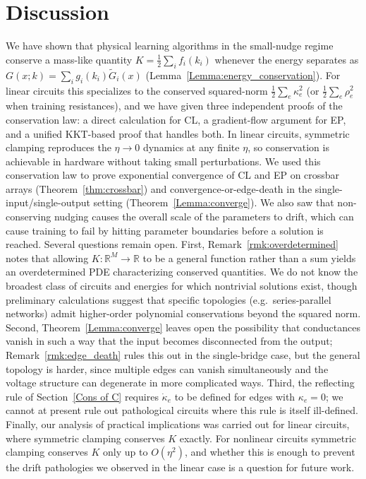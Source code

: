 \documentclass[final, 11pt, nonatbib]{elsarticle}
\theoremstyle{definition}
\theoremstyle{plain}
\numberwithin{equation}{section}
\begin{document}
 \section{Discussion}                                                       
  We have shown that physical learning algorithms in the small-nudge regime   conserve a mass-like quantity $K = \tfrac{1}{2}\sum_i f_i(k_i)$ whenever the energy separates as $G(x;k) = \sum_i g_i(k_i)\widetilde{G}_i(x)$ (Lemma~\ref{Lemma:energy_conservation}). For linear circuits this specializes to the
  conserved squared-norm $\tfrac{1}{2}\sum_e \kappa_e^2$ (or $\tfrac{1}{2}\sum_e \rho_e^2$ when training resistances), and we have given three independent proofs of the conservation law: a direct calculation for CL, a gradient-flow argument for EP, and a unified KKT-based proof that handles   both. In linear circuits, symmetric clamping reproduces the $\eta \to 0$   dynamics at any finite $\eta$, so conservation is achievable in hardware without taking small perturbations. We used this conservation law to prove exponential convergence of CL and EP on crossbar arrays (Theorem~\ref{thm:crossbar}) and convergence-or-edge-death in the single-input/single-output setting (Theorem~\ref{Lemma:converge}). We also saw that non-conserving nudging causes the overall scale of the parameters to drift, which can cause training to fail by hitting parameter boundaries before a solution is reached.                                                                                        
  Several questions remain open. First, Remark~\ref{rmk:overdetermined} notes that  allowing $K \colon \mathbb{R}^M \to \mathbb{R}$ to be a general function rather than a sum yields an overdetermined PDE characterizing conserved quantities. We do not know the broadest class of circuits and energies for which nontrivial solutions exist, though preliminary calculations suggest that specific topologies (e.g.\ series-parallel networks) admit higher-order
  polynomial conservations beyond the squared norm. Second,                  Theorem~\ref{Lemma:converge} leaves open the possibility that conductances vanish in such a way that the input becomes disconnected from the output;  Remark~\ref{rmk:edge_death} rules this out in the single-bridge case, but the general topology is harder, since multiple edges can vanish simultaneously and the voltage structure can degenerate in more complicated ways. Third, the   reflecting rule of Section~\ref{Cons of C} requires $\dot{\kappa}_e$ to                    be defined for edges with $\kappa_e = 0$; we cannot at present rule out      pathological circuits where this rule is itself ill-defined. Finally, our    analysis of practical implications was carried out for linear circuits, where symmetric clamping conserves $K$ exactly. For nonlinear circuits symmetric clamping conserves $K$ only up to $O(\eta^2)$, and whether this is enough to prevent the drift pathologies we observed in the linear case is a question for future work. 
\end{document}
